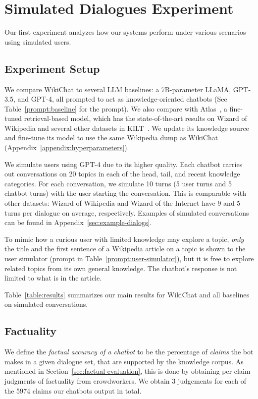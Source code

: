 \documentclass[11pt]{article}
\newcommand{\system}[0]{WikiChat\xspace}
\begin{document}
\section{Simulated Dialogues Experiment}
Our first experiment analyzes how our systems perform under various scenarios using simulated users. 

\subsection{Experiment Setup}
We compare \system to several LLM baselines: a 7B-parameter LLaMA, GPT-3.5, and GPT-4, all prompted to act as knowledge-oriented chatbots (See Table~\ref{prompt:baseline} for the prompt).
We also compare with Atlas~\cite{izacard2022atlas}, a fine-tuned retrieval-based model, which has the state-of-the-art results on Wizard of Wikipedia and several other datasets in KILT~\cite{petroni-etal-2021-kilt}. 
We update its knowledge source and fine-tune its model to use the same Wikipedia dump 
as \system
(Appendix~\ref{appendix:hyperparameters}).

We simulate users using GPT-4 due to its higher quality. Each chatbot carries out conversations on 20 topics in each of the head, tail, and recent knowledge categories. For each conversation, we simulate 10 turns (5 user turns and 5 chatbot turns) with the user starting the conversation. This is comparable with other datasets: Wizard of Wikipedia and Wizard of the Internet have 9 and 5 turns per dialogue on average, respectively. 
Examples of simulated conversations can be found in Appendix~\ref{sec:example-dialogs}.

To mimic how a curious user with limited knowledge may explore a topic, {\em only} the title and the first sentence of a Wikipedia article on a topic is shown to the user simulator (prompt in Table~\ref{prompt:user-simulator}), but it is free to explore related topics from its own general knowledge.
The chatbot's response is not limited to what is in the article.

Table~\ref{table:results} summarizes our main results for \system and all baselines on simulated conversations.

\subsection{Factuality}
We define the {\em factual accuracy of a chatbot} 
to be the percentage of {\em claims} the bot makes in a given dialogue set, that are supported by the knowledge corpus.
As mentioned in Section~\ref{sec:factual-evaluation}, this is done by obtaining per-claim judgments of factuality from crowdworkers. We obtain 3 judgements for each of the 5974 claims our chatbots output in total.
\end{document}
